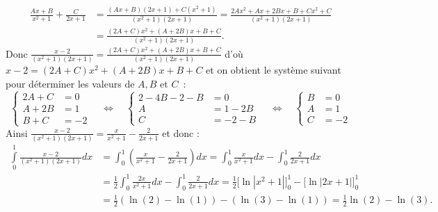 \documentclass[11pt,class=report,crop=false]{standalone}
\begin{document}
\begin{enumerate}
	\begin{equation*} 
		\begin{split} 
			\frac{Ax+B}{x^{2}+1}+\frac{C}{2x+1} 
			&= \frac{(Ax+B)(2x+1) + C(x^2+1)}{(x^2+1)(2x+1)} 
			= \frac{2Ax^2 + Ax + 2Bx + B+ Cx^2+C}{(x^2+1)(2x+1)} \\ 
			&= 
			\frac{(2A+C) x^2 + (A + 2B)x + B + C}{(x^2+1)(2x+1)}. 
		\end{split} 
	\end{equation*} 
	Donc $ \frac{x-2}{(x^{2}+1)(2x+1)} = \frac{(2A+C) x^2 + (A + 2B)x + B 
		+ C}{(x^2+1)(2x+1)} $ d'où $ x - 2 = (2A+C) x^2 + (A + 2B)x + B + C $ 
	et on obtient le système suivant pour déterminer les valeurs de $ A, 
	B $ et $ C $~: 
	\begin{equation*} 
		\begin{cases} 
			2A + C &= 0 \\ 
			A + 2B &= 1 \\ 
			B + C  &= -2 
		\end{cases} 
		\quad \Longleftrightarrow \quad 
		\begin{cases} 
			2 - 4B - 2 - B &= 0 \\ 
			A &= 1 - 2B \\ 
			C &= -2 - B
		\end{cases} 
		\quad \Longleftrightarrow \quad 
		\begin{cases} 
			B &= 0 \\ 
			A &= 1 \\ 
			C &= -2 
		\end{cases} 
	\end{equation*} 
	Ainsi $ \frac{x-2}{(x^{2}+1)(2x+1)} = \frac{x}{x^{2}+1} - \frac{2}{2x+1} $ et donc : 
	\begin{equation*} 
		\begin{split} 
			\int \limits _{0} ^{1} \frac{x-2}{(x^{2}+1)(2x+1)}  dx 
			&= 
			\int_0^1 \left(\frac{x}{x^{2}+1} - \frac{2}{2x+1}\right) dx 
			= 
			\int_0^1 \frac{x}{x^{2}+1} dx - \int_0^1 \frac{2}{2x+1} dx \\ 
			&= 
			\frac{1}{2} \int_0^1 \frac{2x}{x^{2}+1} dx - \int_0^1 \frac{2}{2x+1} dx 
			= 
			\frac{1}{2} \big[\ln|x^2+1|\big]_0^1 - \big[\ln|2x+1|\big]_0^1 \\ 
			&= 
			\frac{1}{2} \left(\ln(2) - \ln(1)\right) - \left(\ln(3) - \ln(1)\right) 
			= \frac12\ln(2) - \ln(3). 
		\end{split} 
	\end{equation*} 
\end{enumerate} 
\fincorrection
\finexercice
\end{document}
